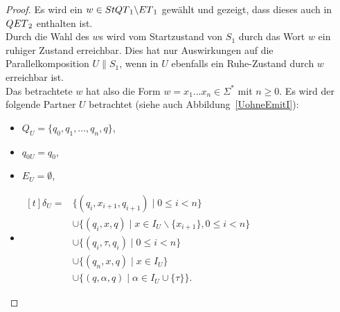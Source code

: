 \begin{proof}
  Es wird ein $w\in StQT{}_1\backslash ET{}_1$ gewählt und gezeigt, dass
  dieses auch in $QET{}_2$ enthalten ist.\\
  Durch die Wahl des $w$s wird vom Startzustand von $S_1$ durch das Wort $w$
  ein ruhiger Zustand erreichbar. Dies hat nur Auswirkungen auf die
  Parallelkomposition $U\|S_1$, wenn in $U$ ebenfalls ein Ruhe-Zustand durch
  $w$ erreichbar ist.\\
  Das betrachtete $w$ hat also die Form $w=x_1\dots x_n\in \Sigma ^*$ mit
  $n\geq 0$. Es wird der folgende Partner $U$ betrachtet (siehe auch
  Abbildung~\ref{UohneEmitI}):
  \begin{itemize}
    \item $Q_U=\{q_0,q_1,\dots ,q_n, q\}$,
    \item $q_{0U}=q_0$,
    \item $E_U=\emptyset$,
    \item $\begin{aligned}[t]
        \delta _U=&\{(q_i,x_{i+1},q_{i+1})\mid  0\leq i< n\}\\
                  &\cup\{(q_i,x,q)\mid  x\in I_U\backslash\{x_{i+1}\}, 0\leq i< n\}\\
                  &\cup\{(q_i,\tau,q_i)\mid 0\leq i< n\}\\
                  &\cup\{(q_n,x,q)\mid x\in I_U\}\\
                  &\cup\{(q,\alpha,q)\mid \alpha\in I_U\cup\{\tau\}\}.
    \end{aligned}$
  \end{itemize}
  \begin{figure} [h!tbp]
  \begin{center}
\end{center}
\end{figure}
\end{proof}
